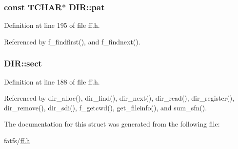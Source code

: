 \subsubsection[{\texorpdfstring{pat}{pat}}]{\setlength{\rightskip}{0pt plus 5cm}const {\bf T\+C\+H\+AR}$\ast$ D\+I\+R\+::pat}\hypertarget{structDIR_a1f636884096de91deb97f59209d60e96}{}\label{structDIR_a1f636884096de91deb97f59209d60e96}


Definition at line 195 of file ff.\+h.



Referenced by f\+\_\+findfirst(), and f\+\_\+findnext().

\subsubsection[{\texorpdfstring{sect}{sect}}]{ D\+I\+R\+::sect}\hypertarget{structDIR_ad01fcc812ed0dad11a593574336adc9e}{}\label{structDIR_ad01fcc812ed0dad11a593574336adc9e}


Definition at line 188 of file ff.\+h.



Referenced by dir\+\_\+alloc(), dir\+\_\+find(), dir\+\_\+next(), dir\+\_\+read(), dir\+\_\+register(), dir\+\_\+remove(), dir\+\_\+sdi(), f\+\_\+getcwd(), get\+\_\+fileinfo(), and sum\+\_\+sfn().



The documentation for this struct was generated from the following file\+:\begin{DoxyCompactItemize}
\item 
fatfs/\hyperlink{ff_8h}{ff.\+h}\end{DoxyCompactItemize}
